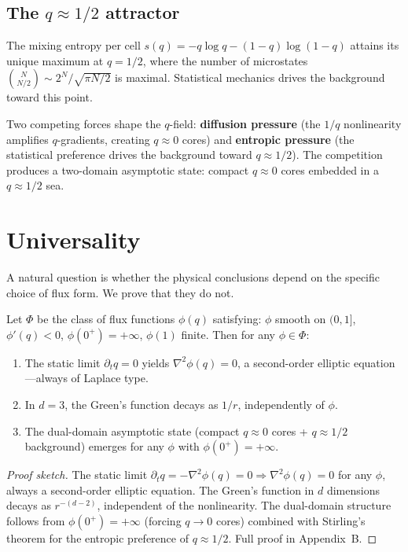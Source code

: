 \documentclass[12pt]{article}
\begin{document}
\subsection{The $q\approx 1/2$ attractor}

The mixing entropy per cell $s(q)=-q\log q-(1-q)\log(1-q)$ attains its unique maximum at $q=1/2$, where the number of microstates $\binom{N}{N/2}\sim 2^N/\sqrt{\pi N/2}$ is maximal. Statistical mechanics drives the background toward this point.

Two competing forces shape the $q$-field: \textbf{diffusion pressure} (the $1/q$ nonlinearity amplifies $q$-gradients, creating $q\approx 0$ cores) and \textbf{entropic pressure} (the statistical preference drives the background toward $q\approx 1/2$). The competition produces a two-domain asymptotic state: compact $q\approx 0$ cores embedded in a $q\approx 1/2$ sea.

\section{Universality}

A natural question is whether the physical conclusions depend on the specific choice of flux form. We prove that they do not.

\begin{theorem}
\label{thm:universality}
Let $\Phi$ be the class of flux functions $\phi(q)$ satisfying: $\phi$ smooth on $(0,1]$, $\phi'(q)<0$, $\phi(0^+)=+\infty$, $\phi(1)$ finite. Then for any $\phi\in\Phi$:
\begin{enumerate}
\item The static limit $\partial_t q=0$ yields $\nabla^2\phi(q)=0$, a second-order elliptic equation---always of Laplace type.
\item In $d=3$, the Green's function decays as $1/r$, independently of $\phi$.
\item The dual-domain asymptotic state (compact $q\approx 0$ cores + $q\approx 1/2$ background) emerges for any $\phi$ with $\phi(0^+)=+\infty$.
\end{enumerate}
\end{theorem}
\begin{proof}[Proof sketch]
The static limit $\partial_t q = -\nabla^2\phi(q) = 0 \Rightarrow \nabla^2\phi(q)=0$ for any $\phi$, always a second-order elliptic equation. The Green's function in $d$ dimensions decays as $r^{-(d-2)}$, independent of the nonlinearity. The dual-domain structure follows from $\phi(0^+)=+\infty$ (forcing $q\to 0$ cores) combined with Stirling's theorem for the entropic preference of $q\approx 1/2$. Full proof in Appendix~B.
\end{proof}
\end{document}

